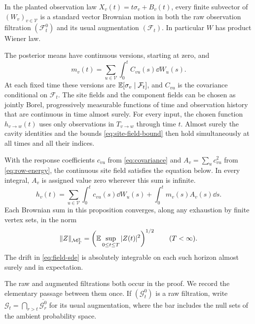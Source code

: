 \begin{proposition}
 \label{prop:innovations}
In the planted observation law $X_v(t)=t\sigma_v+B_v(t)$, every finite
subvector of $(W_v)_{v\in\mathcal V}$ is a standard vector Brownian
motion in both the raw observation filtration $(\mathcal F_t^0)$ and
its usual augmentation $(\mathcal F_t)$.  In particular $W$ has product
Wiener law.

The posterior means have continuous versions, starting at zero, and
\begin{equation}
 \label{eq:magnetization-sde}
 m_v(t)=\sum_{u\in\mathcal V}\int_0^t C_{vu}(s)\dd W_u(s).
\end{equation}
At each fixed time these versions are
$\mathbb E[\sigma_v\mid\mathcal F_t]$, and $C_{vu}$ is the covariance
conditional on $\mathcal F_t$.  The site fields and the component
fields can be chosen as jointly Borel, progressively measurable
functions of time and observation history that are continuous in time
almost surely.  For every input, the chosen function
$h_{v\to w}(t)$ uses only observations in $T_{v\to w}$ through time
$t$.  Almost surely the cavity identities and the bounds
\eqref{eq:site-field-bound} then hold simultaneously at all times and
all their indices.

With the response coefficients $c_{vu}$ from
\eqref{eq:covariance} and $A_v=\sum_u c_{vu}^2$ from
\eqref{eq:row-energy}, the continuous site field satisfies the equation
below.  In every integral, $A_v$ is assigned value zero wherever this
sum is infinite.
\begin{equation}
 \label{eq:field-sde}
 h_v(t)=\sum_{u\in\mathcal V}\int_0^t c_{vu}(s)\dd W_u(s)
            +\int_0^t m_v(s)A_v(s)\dd s.
\end{equation}
Each Brownian sum in this proposition converges, along any exhaustion
by finite vertex sets, in the norm
\[
 \|Z\|_{\mathcal M_T^2}
       =\left(\mathbb E\sup_{0\le t\le T}|Z(t)|^2\right)^{1/2}
       \qquad(T<\infty).
\]
The drift in \eqref{eq:field-sde} is absolutely integrable on each such
horizon almost surely and in expectation.
\end{proposition}

The raw and augmented filtrations both occur in the proof.  We record
the elementary passage between them once.  If $(\mathcal G_t^0)$ is a
raw filtration, write
$\mathcal G_t=\bigcap_{r>t}\overline{\mathcal G_r^0}$ for its usual
augmentation, where the bar includes the null sets of the ambient
probability space.

